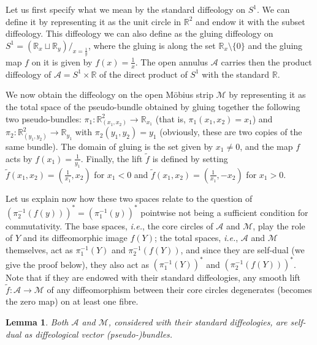 \documentclass{article}
\newtheorem{lemma}{Lemma}[section]
\newcommand\matR{{\mathbb{R}}}
\begin{document}
Let us first specify what we mean by the standard diffeology on $S^1$. We can define it by representing it as the unit circle in $\matR^2$ and endow it with the subset diffeology. This diffeology we can also
define as the gluing diffeology on $S^1=(\matR_x\sqcup\matR_y)/_{x=\frac{1}{y}}$, where the gluing is along the set $\matR_x\setminus\{0\}$ and the gluing map $f$ on it is given by $f(x)=\frac{1}{x}$. 
The open annulus $\mathcal{A}$ carries then the product diffeology of $\mathcal{A}=S^1\times\matR$ of the direct product of $S^1$ with the standard $\matR$.

We now obtain the diffeology on the open M\"obius strip $\mathcal{M}$ by representing it as the total space of the pseudo-bundle obtained by gluing together the following two pseudo-bundles: 
$\pi_1:\matR^2_{(x_1,x_2)}\to\matR_{x_1}$ (that is, $\pi_1(x_1,x_2)=x_1$) and $\pi_2:\matR^2_{(y_1,y_2)}\to\matR_{y_1}$ with $\pi_2(y_1,y_2)=y_1$ (obviously, these are two copies of the same bundle). 
The domain of gluing is the set given by $x_1\neq 0$, and the map $f$ acts by $f(x_1)=\frac{1}{y_1}$. Finally, the lift $\tilde{f}$ is defined by setting $\tilde{f}(x_1,x_2)=(\frac{1}{x_1},x_2)$ for $x_1<0$ and
$\tilde{f}(x_1,x_2)=(\frac{1}{x_1},-x_2)$ for $x_1>0$.

Let us explain now how these two spaces relate to the question of $(\pi_2^{-1}(f(y)))^*=(\pi_1^{-1}(y))^*$ pointwise not being a sufficient condition for commutativity. The base spaces, \emph{i.e.}, the core 
circles of $\mathcal{A}$ and $\mathcal{M}$, play the role of $Y$ and its diffeomorphic image $f(Y)$; the total spaces, \emph{i.e.}, $\mathcal{A}$ and $\mathcal{M}$ themselves, act as $\pi_1^{-1}(Y)$ and 
$\pi_2^{-1}(f(Y))$, and since they are self-dual (we give the proof below), they also act as $(\pi_1^{-1}(Y))^*$ and $(\pi_2^{-1}(f(Y)))^*$. Note that if they are endowed with their standard diffeologies, any 
smooth lift $\tilde{f}:\mathcal{A}\to\mathcal{M}$ of any diffeomorphism between their core circles degenerates (becomes the zero map) on at least one fibre.

\begin{lemma}
Both $\mathcal{A}$ and $\mathcal{M}$, considered with their standard diffeologies, are self-dual as diffeological vector (pseudo-)bundles.
\end{lemma}
\end{document}
